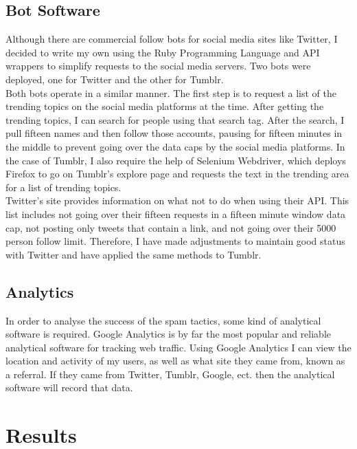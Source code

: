 \documentclass{article}
\begin{document}
\subsection{Bot Software}
Although there are commercial follow bots for social media sites like Twitter, I decided to write my own using the Ruby Programming Language and API wrappers to simplify requests to the social media servers. Two bots were deployed, one for Twitter and the other for Tumblr.
\\
Both bots operate in a similar manner. The first step is to request a list of the trending topics on the social media platforms at the time. After getting the trending topics, I can search for people using that search tag. After the search, I pull fifteen names and then follow those accounts, pausing for fifteen minutes in the middle to prevent going over the data caps by the social media platforms. In the case of Tumblr, I also require the help of Selenium Webdriver, which deploys Firefox to go on Tumblr's explore page and requests the text in the trending area for a list of trending topics. \\
Twitter's site provides information on what not to do when using their API. This list includes not going over their fifteen requests in a fifteen minute window data cap, not posting only tweets that contain a link, and not going over their 5000 person follow limit. Therefore, I have made adjustments to maintain good status with Twitter and have applied the same methods to Tumblr.  

\subsection{Analytics}
In order to analyse the success of the spam tactics, some kind of analytical software is required. Google Analytics is by far the most popular and reliable analytical software for tracking web traffic. Using Google Analytics I can view the location and activity of my users, as well as what site they came from, known as a referral. If they came from Twitter, Tumblr, Google, ect. then the analytical software will record that data.

\section{Results}
\end{document}
